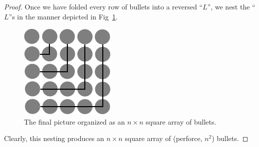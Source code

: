 \begin{proof}
Once we have folded every row of bullets into a reversed ``$L$'', we nest
the ``$L$''s in the manner depicted in Fig~\ref{fig:sumOdds3}.
\begin{figure}[h]
\begin{center}
       \includegraphics[scale=0.4]{FiguresMaths/SumOddsFinal}
\caption{The final picture organized as an $n \times n$ square
  array of bullets.}
       \label{fig:sumOdds3}
\end{center}
\end{figure}
Clearly, this nesting produces an $n \times n$ square array of
(perforce, $n^2$) bullets.
\end{proof}

\medskip

